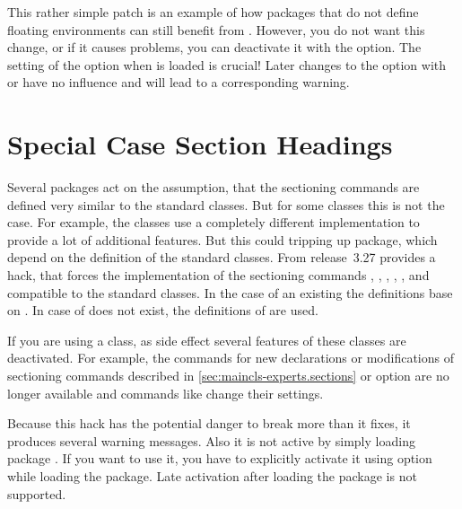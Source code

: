 This rather simple patch is an example of how packages that do not define
floating environments can still benefit from . However, you
do not want this change, or if it causes problems, you can deactivate it with
the %
 option.
The setting of the option when  is loaded
is crucial! Later changes to the option with
 or 
have no influence and will lead to a corresponding warning.%


\section{Special Case Section Headings}

Several packages act on the assumption,
that the sectioning commands are defined very similar to the standard
classes. But for some classes this is not the case. For example, the
\KOMAScript{} classes use a completely different implementation to provide a
lot of additional features. But this could tripping up package, which depend
on the definition of the standard classes. From release~3.27 
provides a hack, that forces the implementation of the sectioning commands
,
,
,
,
,
 and
 compatible to the
standard classes. In the case of an existing  the
definitions base on . In case of 
does not exist, the definitions of  are used.

If you are using a \KOMAScript{} class, as side effect several features of
these classes are deactivated. For example, the commands for new declarations
or modifications of sectioning commands described in
\autoref{sec:maincls-experts.sections} or option
 are no longer available and commands like
 change their settings.

Because this hack has the potential danger to break more than it fixes, it
produces several warning messages. Also it is not active by simply loading
package . If you want to use it, you have to explicitly
activate it using option
 while
loading the package. Late activation after loading the package is not
supported.

